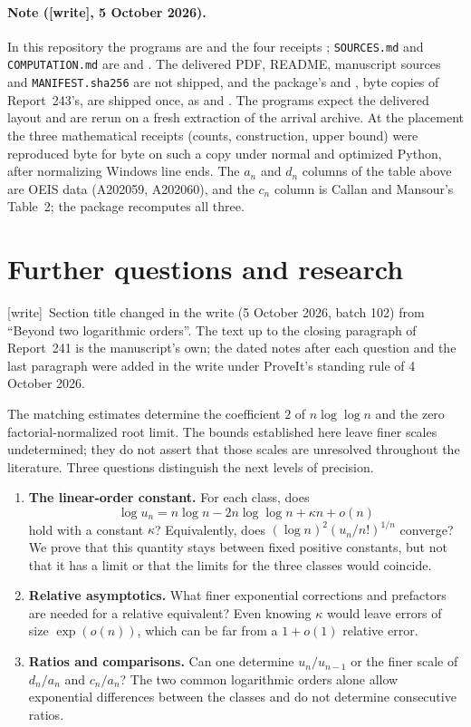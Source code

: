 \documentclass[11pt,letterpaper]{article}
\theoremstyle{remark}\newtheorem{remark}[theorem]{Remark}
\newcommand{\wtag}{\textup{[write]}}
\theoremstyle{remark}\newtheorem{wremark}{Remark}\renewcommand{\thewremark}{W\arabic{wremark}}
\theoremstyle{plain}\newtheorem{wcorollary}[wremark]{Corollary}
\begin{document}
\paragraph{Note (\wtag, 5 October 2026).} In this repository the programs
are  and the four receipts
; \texttt{SOURCES.md} and
\texttt{COMPUTATION.md} are  and
. The delivered PDF, README, manuscript
sources and \texttt{MANIFEST.sha256} are not shipped, and the package's
 and , byte
copies of Report~243's, are shipped once, as
 and
. The programs expect the delivered
layout and are rerun on a fresh extraction of the arrival archive. At the
placement the three mathematical receipts (counts, construction, upper
bound) were reproduced byte for byte on such a copy under normal and
optimized Python, after normalizing Windows line ends. The $a_n$ and $d_n$
columns of the table above are OEIS data (A202059, A202060), and the $c_n$
column is Callan and Mansour's Table~2; the package recomputes all three.
\section{Further questions and research}\label{a59:g:sec:outlook}
\wtag\ Section title changed in the write (5 October 2026, batch 102) from
``Beyond two logarithmic orders''. The text up to the closing paragraph
of Report~241 is the manuscript's own; the dated notes after each question
and the last paragraph were added in the write under ProveIt's standing
rule of 4 October 2026.

The matching estimates determine the coefficient $2$ of $n\log\log n$ and the zero factorial-normalized root limit. The bounds established here leave finer scales undetermined; they do not assert that those scales are unresolved throughout the literature. Three questions distinguish the next levels of precision.
\begin{enumerate}
\item \textbf{The linear-order constant.} For each class, does
\[
 \log u_n=n\log n-2n\log\log n+\kappa n+o(n)
\]
hold with a constant $\kappa$? Equivalently, does
$(\log n)^2(u_n/n!)^{1/n}$ converge? We prove that this quantity stays between fixed positive constants, but not that it has a limit or that the limits for the three classes would coincide.
\item \textbf{Relative asymptotics.} What finer exponential corrections and prefactors are needed for a relative equivalent? Even knowing $\kappa$ would leave errors of size $\exp(o(n))$, which can be far from a $1+o(1)$ relative error.
\item \textbf{Ratios and comparisons.} Can one determine $u_n/u_{n-1}$ or the finer scale of $d_n/a_n$ and $c_n/a_n$? The two common logarithmic orders alone allow exponential differences between the classes and do not determine consecutive ratios.
\end{enumerate}
\end{document}
